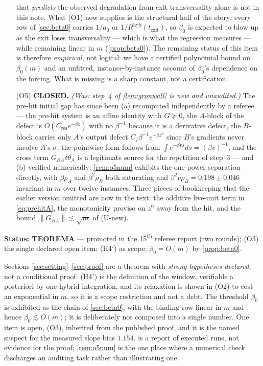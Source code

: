 \documentclass[11pt]{article}
\theoremstyle{definition}
\theoremstyle{remark}
\newcommand{\hyb}{\mathrm{hyb}}
\newcommand{\texit}{t_{\mathrm{exit}}}
\begin{document}
\begin{enumerate}
that \emph{predicts} the observed degradation from exit transversality alone is
not in this note. What (O1) now supplies is the structural half of the story:
every row of \cref{sec:beta0} carries $1/a_0$ or $1/R^{\hyb}(\texit)$, so
$\beta_0$ is expected to blow up as the exit loses transversality --- which is
what the regression measures --- while remaining linear in $m$
(\cref{prop:beta0}). The remaining status of this item is therefore
\emph{empirical}, not logical: we have a certified polynomial bound on
$\beta_0(m)$ and an unfitted, instance-by-instance account of $\beta_0$'s
dependence on the forcing. What is missing is a sharp constant, not a
certification.
\item[(O5)] \textbf{CLOSED.} \emph{(Was: step~4 of \cref{lem:gronwall} is new and
unaudited.)} The pre-hit initial gap has since been (a) recomputed independently
by a referee --- the pre-hit system is an affine identity with $G\succeq0$, the
$A$-block of the defect is $O(C_{\mathrm{res}}e^{-\beta z})$ with no $\beta^{-1}$
because it is a derivative defect, the $B$-block carries only $A$'s output defect
$C_f\beta^{-1}e^{-\beta z^0}$ since $B$'s gradients never involve $A$'s
$\sigma$, the pointwise form follows from
$\int e^{-\beta v s}ds=(\beta v)^{-1}$, and the cross term $G_{BA}\delta\theta_A$
is a legitimate source for the repetition of step~3 --- and (b) verified
numerically: \cref{rem:o5num} exhibits the one-power separation directly, with
$\beta\rho_A$ and $\beta^2\rho_B$ both saturating and
$\beta^2v\rho_B=0.198\pm0.046$ invariant in $m$ over twelve instances. Three
pieces of bookkeeping that the earlier version omitted are now in the text: the
additive live-unit term in \eqref{eq:prehitA}, the monotonicity proviso on $z^0$
away from the hit, and the bound $\|G_{BA}\|\lesssim\sqrt m$ of (U-new).
\end{enumerate}

\bigskip
\noindent\textbf{Status: TEOREMA} --- promoted in the 15\textsuperscript{th}
referee report (two rounds); (O3) the single declared open item; (H4$'$) as
scope; $\beta_0=O(m)$ by \cref{prop:beta0}.

\smallskip
\noindent Sections \ref{sec:setting}--\ref{sec:proof} are a
theorem with \emph{strong hypotheses declared}, not a conditional proof:
(H4$'$) is the definition of the window, verifiable a posteriori by one hybrid
integration, and its relaxation is shown in (O2) to cost an exponential in $m$,
so it is a scope restriction and not a debt. The threshold $\beta_0$ is
exhibited as the chain of \cref{sec:beta0}, with the binding row linear in $m$
and hence $\beta_0\lesssim O(m)$; it is deliberately not composed into a single
number. One item is open, (O3), inherited from the published proof, and it is the
named suspect for the measured slope bias $1.154$.  is a
report of executed runs, not evidence for the proof; \cref{rem:o5num} is the one
place where a numerical check discharges an auditing task rather than
illustrating one.
\end{document}
